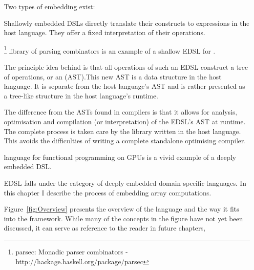 \documentclass[preamble.tex]{subfiles}
\begin{document}
Two types of embedding exist:
\begin{description}
\item {}

Shallowly embedded DSLs directly translate their constructs to expressions in the host language. They offer a fixed interpretation of their operations.

\footnote{parsec: Monadic parser combinators - http://hackage.haskell.org/package/parsec} library of parsing combinators is an example of a shallow EDSL for \Haskell.

\item {} 

The principle idea behind  is that all operations of such an EDSL construct a tree of operations, or an  (AST).\iast This new AST is a data structure in the host language. It is separate from the host language's AST and is rather presented as a tree-like structure in the host language's runtime.

The difference from the ASTs found in compilers is that it allows for analysis, optimisation and compilation (or interpretation) of the EDSL's AST at runtime. The complete process is taken care by the library written in the host language. This avoids the difficulties of writing a complete standalone optimising compiler.

 language for functional programming on GPUs \cite{CKL+11} is a vivid example of a deeply embedded DSL.
\end{description}

\LiveFusion EDSL falls under the category of deeply embedded domain-specific languages. In this chapter I describe the process of embedding array computations.

Figure~\ref{fig:Overview} presents the overview of the \LiveFusion language and the way it fits into the  framework. While many of the concepts in the figure have not yet been discussed, it can serve as reference to the reader in future chapters,
\end{document}
